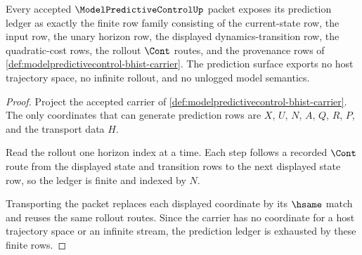 \begin{theorem}
\label{thm:modelpredictivecontrol-finite-horizon-obligation}
Every accepted $\ModelPredictiveControlUp$ packet exposes its prediction
ledger as exactly the finite row family consisting of the current-state row,
the input row, the unary horizon row, the displayed dynamics-transition row,
the quadratic-cost rows, the rollout $\Cont$ routes, and the provenance rows
of \autoref{def:modelpredictivecontrol-bhist-carrier}. The prediction surface
exports no host trajectory space, no infinite rollout, and no unlogged model
semantics.
\end{theorem}
\begin{proof}
Project the accepted carrier of
\autoref{def:modelpredictivecontrol-bhist-carrier}. The only coordinates that
can generate prediction rows are $X$, $U$, $N$, $A$, $Q$, $R$, $P$, and the
transport data $H$.

Read the rollout one horizon index at a time. Each step follows a recorded
$\Cont$ route from the displayed state and transition rows to the next
displayed state row, so the ledger is finite and indexed by $N$.

Transporting the packet replaces each displayed coordinate by its $\hsame$
match and reuses the same rollout routes. Since the carrier has no coordinate
for a host trajectory space or an infinite stream, the prediction ledger is
exhausted by these finite rows.
\end{proof}

